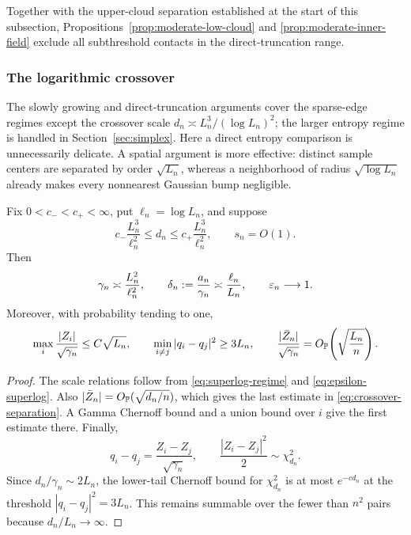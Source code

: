 Together with the upper-cloud separation established at the start of this
subsection, Propositions~\ref{prop:moderate-low-cloud} and
\ref{prop:moderate-inner-field} exclude all subthreshold contacts in the
direct-truncation range.

\subsubsection{The logarithmic crossover}
\label{sec:constant-crossover}

The slowly growing and direct-truncation arguments cover the sparse-edge
regimes except the crossover scale
\(d_n\asymp L_n^3/(\log L_n)^2\); the larger entropy regime is handled
in Section~\ref{sec:simplex}. Here a direct entropy comparison is
unnecessarily delicate.  A spatial argument is more effective: distinct
sample centers are separated by order \(\sqrt{L_n}\), whereas a neighborhood
of radius \(\sqrt{\log L_n}\) already makes every nonnearest Gaussian bump
negligible.

\begin{lemma}
\label{lem:crossover-geometry}
Fix \(0<c_-<c_+<\infty\), put \(\ell_n=\log L_n\), and suppose
\[
 c_-\frac{L_n^3}{\ell_n^2}
 \le d_n\le
 c_+\frac{L_n^3}{\ell_n^2},
 \qquad s_n=O(1).
\]
Then
\begin{equation}
\label{eq:crossover-scales}
 \gamma_n\asymp\frac{L_n^2}{\ell_n^2},
 \qquad
 \delta_n:=\frac{a_n}{\gamma_n}\asymp\frac{\ell_n}{L_n},
 \qquad
 \varepsilon_n\longrightarrow1.
\end{equation}
Moreover, with probability tending to one,
\begin{equation}
\label{eq:crossover-separation}
 \max_i\frac{|Z_i|}{\sqrt{\gamma_n}}\le C\sqrt{L_n},
 \qquad
 \min_{i\ne j}|q_i-q_j|^2\ge3L_n,
 \qquad
 \frac{|\bar Z_n|}{\sqrt{\gamma_n}}
 =O_{\mathbb P}\!\left(\sqrt{\frac{L_n}{n}}\right).
\end{equation}
\end{lemma}

\begin{proof}
The scale relations follow from \eqref{eq:superlog-regime} and
\eqref{eq:epsilon-superlog}.  Also
\(|\bar Z_n|=O_{\mathbb P}(\sqrt{d_n/n})\), which gives the last estimate in
\eqref{eq:crossover-separation}.  A Gamma Chernoff bound and a union bound
over \(i\) give the first estimate there.  Finally,
\[
 q_i-q_j=\frac{Z_i-Z_j}{\sqrt{\gamma_n}},
 \qquad
 \frac{|Z_i-Z_j|^2}{2}\sim\chi^2_{d_n}.
\]
Since \(d_n/\gamma_n\sim2L_n\), the lower-tail Chernoff bound for
\(\chi^2_{d_n}\) is at most \(e^{-c d_n}\) at the threshold
\(|q_i-q_j|^2=3L_n\).  This remains summable over the fewer than \(n^2\)
pairs because \(d_n/L_n\to\infty\).
\end{proof}


